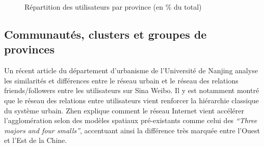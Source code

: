 \begin{figure}[h!]
    \centering
    \caption{
        Répartition des utilisateurs par province (en \% du total)
    }

\end{figure}


\subsection{Communautés, clusters et groupes de provinces}

Un récent article du département d{\textquoteright}urbanisme de l{\textquoteright}Université de Nanjing \citep{Zhen2013} analyse les similarités et différences entre le réseau urbain et le réseau des relations friends/followers entre les utilisateurs sur Sina Weibo. Il y est notamment montré que le réseau des relations entre utilisateurs vient renforcer la hiérarchie classique du système urbain. Zhen explique comment le réseau Internet vient accélérer l{\textquoteright}agglomération selon des modèles spatiaux pré-existants comme celui des \textit{``Three majors and four smalls''}, accentuant ainsi la différence très marquée entre l{\textquoteright}Ouest et l{\textquoteright}Est de la Chine.

